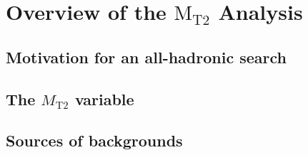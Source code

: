 \chapter{Overview of the $\text{M}_\text{T2}$ Analysis}

\section{Motivation for an all-hadronic search}

\section{The $M_\text{T2}$ variable}

\section{Sources of backgrounds}
